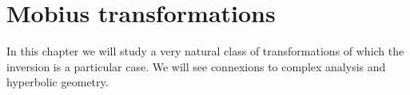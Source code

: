 \chapter{Mobius transformations}In this chapter we will study a very natural class of transformations of which the inversion is a particular case. We will see connexions to complex analysis and hyperbolic geometry.%